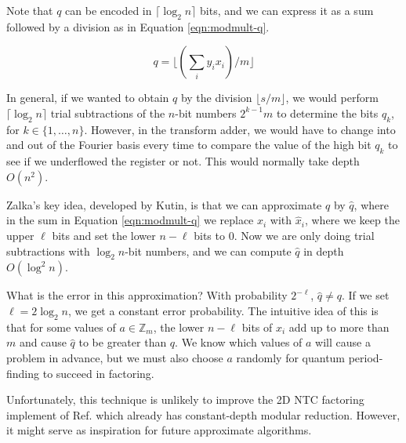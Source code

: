 Note that $q$ can be encoded in $\lceil \log_2 n \rceil$ bits, and we can
express it as a sum followed by a division as in Equation \ref{eqn:modmult-q}.

\begin{equation}
q = \lfloor ( \sum_{i} y_i x_i ) / m \rfloor
\label{eqn:modmult-q}
\end{equation}

In general, if we wanted to obtain $q$ by the division $\lfloor s/m \rfloor$,
we would perform $\lceil \log_2 n \rceil$ trial subtractions of the
$n$-bit numbers $2^{k-1} m$ to determine the
bits $q_k$, for $k \in \{1, \ldots, n\}$. However, in the transform adder,
we would have to change into and out of the Fourier basis every time to
compare the value of the high bit $q_k$ to see if we underflowed the register
or not. This would normally take depth $O(n^2)$.

Zalka's key idea, developed by Kutin, is that we can approximate $q$ by
$\hat{q}$, where in the sum in Equation \ref{eqn:modmult-q} we replace
$x_i$ with $\hat{x}_i$, where we keep the upper $\ell$ bits and set the
lower $n - \ell$ bits to 0. Now we are only doing trial subtractions with
$\log_2 n$-bit numbers, and we can compute $\hat{q}$ in depth $O(\log^2 n)$.

What is the error in this approximation? With probability $2^{-\ell}$,
$\hat{q} \ne q$. If we set $\ell = 2\log_2 n$, we get a constant error
probability. The intuitive idea of this is that for some values of
$a \in \mathbb{Z}_m$, the lower $n - \ell$ bits of $x_i$ add up to more than
$m$ and cause $\hat{q}$ to be greater than $q$. We know which values of $a$
will cause a problem in advance, but we must also choose $a$ randomly for
quantum period-finding to succeed in factoring.

Unfortunately, this technique is unlikely to improve the 2D NTC factoring implement of
Ref. \cite{Pham2012b} which already has constant-depth modular reduction.
However, it might serve as inspiration for future approximate algorithms.


